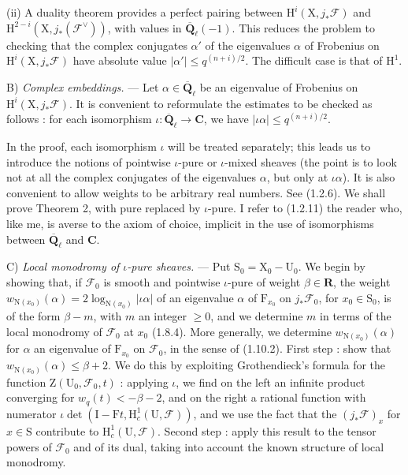 \documentclass[11pt,leqno]{article}
\begin{document}
(ii) A duality theorem provides a perfect pairing between \(\mathrm{H}^i(\mathrm{X},j_*\mathscr{F})\) and \(\mathrm{H}^{2-i}(\mathrm{X},j_*(\mathscr{F}^{\vee}))\), with values in \(\overline{\mathbf{Q}}_\ell(-1)\). This reduces the problem to checking that the complex conjugates \(\alpha'\) of the eigenvalues \(\alpha\) of Frobenius on \(\mathrm{H}^i(\mathrm{X},j_*\mathscr{F})\) have absolute value \(|\alpha'|\leq q^{(n+i)/2}\). The difficult case is that of \(\mathrm{H}^1\).

B) \textit{Complex embeddings.} — Let \(\alpha\in\overline{\mathbf{Q}}_\ell\) be an eigenvalue of Frobenius on \(\mathrm{H}^i(\mathrm{X},j_*\mathscr{F})\). It is convenient to reformulate the estimates to be checked as follows : for each isomorphism \(\iota:\overline{\mathbf{Q}}_\ell\to\mathbf{C}\), we have \(|\iota\alpha|\leq q^{(n+i)/2}\).

In the proof, each isomorphism \(\iota\) will be treated separately; this leads us to introduce the notions of pointwise \(\iota\)-pure or \(\iota\)-mixed sheaves (the point is to look not at all the complex conjugates of the eigenvalues \(\alpha\), but only at \(\iota\alpha\)). It is also convenient to allow weights to be arbitrary real numbers. See (1.2.6). We shall prove Theorem 2, with pure replaced by \(\iota\)-pure. I refer to (1.2.11) the reader who, like me, is averse to the axiom of choice, implicit in the use of isomorphisms between \(\overline{\mathbf{Q}}_\ell\) and \(\mathbf{C}\).

C) \textit{Local monodromy of \(\iota\)-pure sheaves.} — Put \(\mathrm{S}_0=\mathrm{X}_0-\mathrm{U}_0\). We begin by showing that, if \(\mathscr{F}_0\) is smooth and pointwise \(\iota\)-pure of weight \(\beta\in\mathbf{R}\), the weight \(w_{\mathrm{N}(x_0)}(\alpha)=2\log_{\mathrm{N}(x_0)}|\iota\alpha|\) of an eigenvalue \(\alpha\) of \(\mathrm{F}_{x_0}\) on \(j_*\mathscr{F}_0\), for \(x_0\in\mathrm{S}_0\), is of the form \(\beta-m\), with \(m\) an integer \(\geq 0\), and we determine \(m\) in terms of the local monodromy of \(\mathscr{F}_0\) at \(x_0\) (1.8.4). More generally, we determine \(w_{\mathrm{N}(x_0)}(\alpha)\) for \(\alpha\) an eigenvalue of \(\mathrm{F}_{x_0}\) on \(\mathscr{F}_0\), in the sense of (1.10.2). First step : show that \(w_{\mathrm{N}(x_0)}(\alpha)\leq\beta+2\). We do this by exploiting Grothendieck’s formula for the function \(\mathrm{Z}(\mathrm{U}_0,\mathscr{F}_0,t)\) : applying \(\iota\), we find on the left an infinite product converging for \(w_q(t)<-\beta-2\), and on the right a rational function with numerator \(\iota\det(\mathrm{I}-\mathrm{F}t,\mathrm{H}_c^1(\mathrm{U},\mathscr{F}))\), and we use the fact that the \((j_*\mathscr{F})_x\) for \(x\in\mathrm{S}\) contribute to \(\mathrm{H}_c^1(\mathrm{U},\mathscr{F})\). Second step : apply this result to the tensor powers of \(\mathscr{F}_0\) and of its dual, taking into account the known structure of local monodromy.
\end{document}
